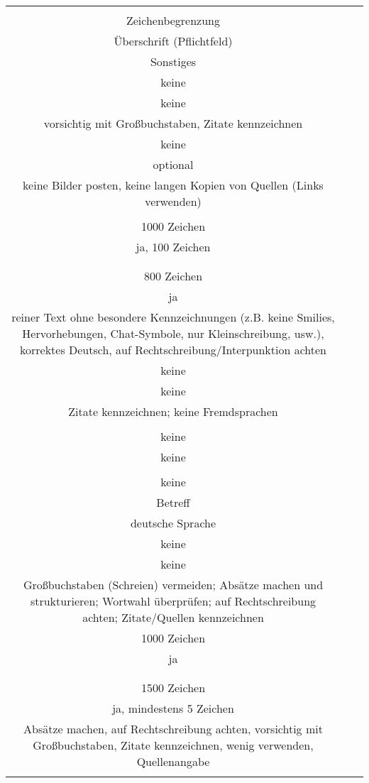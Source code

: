 \begin{landscape}
\begin{tabular}{ccc}
{		
Kommentar: formale Regeln\\
Zeichenbegrenzung\\
Überschrift (Pflichtfeld)\\
Sonstiges 
&		%
		\\
		keine\\
		keine\\
		vorsichtig mit Großbuchstaben, Zitate kennzeichnen	
		&
		\\
		keine\\
		optional\\
		keine Bilder posten, keine langen Kopien von Quellen (Links verwenden)\\
		&
		\\
		1000 Zeichen\\
		ja, 100 Zeichen\\
		\\
		&
		\\
		800 Zeichen\\
		ja\\
		reiner Text ohne besondere Kennzeichnungen (z.B. keine Smilies, Hervorhebungen, Chat-Symbole, nur Kleinschreibung, usw.), korrektes Deutsch, auf Rechtschreibung/Interpunktion achten
		&
		\\
		keine\\
		keine\\
		Zitate kennzeichnen; keine Fremdsprachen\\
		&
		\\
		keine\\
		keine\\
		&
		\\
		keine\\
		Betreff\\
		deutsche Sprache
		&
		\\
		keine\\
		keine\\
		Großbuchstaben (Schreien) vermeiden; Absätze machen und strukturieren; Wortwahl überprüfen; auf Rechtschreibung achten; 				Zitate/Quellen kennzeichnen
		&
		\\
		1000 Zeichen\\
		ja\\
		\\
		&
		\\
		1500 Zeichen\\
		ja, mindestens 5 Zeichen\\
		Absätze machen, auf Rechtschreibung achten, vorsichtig mit Großbuchstaben, Zitate kennzeichnen, wenig verwenden, Quellenangabe\\
}
\end{tabular}
\end{landscape}

